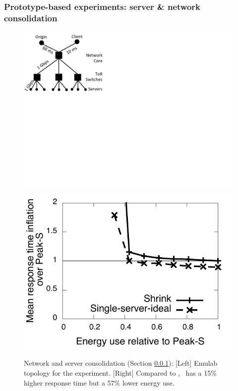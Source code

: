 \subsubsection{Prototype-based experiments: server \& network consolidation}
\label{sec:emulab}

\begin{figure}
	\centering
\includegraphics[scale=0.35]{figures/emulab-topo.pdf}
\includegraphics[scale=0.5]{graphs/final/emulab-mean.pdf}
\caption{Network and server consolidation (Section \ref{sec:emulab}): [Left] Emulab topology for the experiment. [Right] Compared to \peakS, \shrink\ has a 15\% higher response time but a 57\% lower energy use.}
\label{fig:emulab}
\end{figure}

